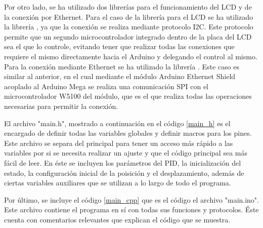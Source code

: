 Por otro lado, se ha utilizado dos librerías para el funcionamiento del LCD y de la conexión por Ethernet. Para el caso
de la librería para el LCD se ha utilizado la librería \cite{lcd}, ya que la conexión se realiza mediante protocolo I2C.
Este protocolo permite que un segundo microcontrolador integrado dentro de la placa del LCD sea el que lo controle, evitando
tener que realizar todas las conexiones que requiere el mismo directamente hacia el Arduino y delegando el control al mismo.
Para la conexión mediante Ethernet se ha utilizado la librería \cite{ethernet}. Este caso es similar al anterior, en el cual
mediante el módulo Arduino Ethernet Shield acoplado al Arduino Mega se realiza una comunicación SPI con el microcontrolador 
W5100 del módulo, que es el que realiza todas las operaciones necesarias para permitir la conexión.

El archivo "main.h", mostrado a continuación en el código \ref{main_h} es el encargado de definir todas las variables globales
y definir macros para los pines. Este archivo se separa del principal para tener un acceso más rápido a las variables por si 
se necesita realizar un ajuste y que el código principal sea más fácil de leer. En éste se incluyen los parámetros del PID,
la inicialización del estado, la configuración inicial de la poisición y el desplazamiento, además de ciertas variables auxiliares
que se utilizan a lo largo de todo el programa.



Por último, se incluye el código \ref{main_cpp} que es el código el archivo "main.ino". Este archivo contiene el programa en sí
con todas sus funciones y protocolos. Éste cuenta con comentarios relevantes que explican el código que se muestra.

